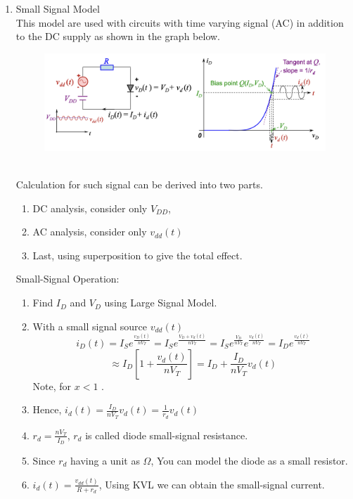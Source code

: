 \begin{enumerate}
\begin{enumerate}
    \end{enumerate}
    \newpage
    \item Small Signal Model \\
    This model are used with circuits with time varying signal (AC) in addition to the DC supply as shown in the graph below.
    \begin{figure}[h]
        \centering
        \includegraphics[width=1\linewidth]{image/smallsignalmodel.png}
    \end{figure}\\
    Calculation for such signal can be derived into two parts.
    \begin{enumerate}
        \item DC analysis, consider only $V_{DD}$, 
        \item AC analysis, consider only $v_{dd}(t)$
        \item Last, using superposition to give the total effect.
    \end{enumerate}
    Small-Signal Operation:
    \begin{enumerate}
        \item Find $I_D$ and $V_D$ using Large Signal Model.
        \item With a small signal source $v_{dd}(t)$
        \[i_D(t) = I_S e^{\frac{v_D(t)}{nV_T}} = I_S e^{\frac{V_D + v_d(t)}{nV_T}} = I_S e^{\frac{V_D}{nV_T}} e^{\frac{v_d(t)}{nV_T}} = I_D e^{\frac{v_d(t)}{nV_T}}\]
        \[\approx I_D[1+\frac{v_d(t)}{nV_T}] = I_D + \frac{I_D}{nV_T}v_d(t)\]
        Note, {\color{red}{\(e^x \approx 1 + x\)}} for $x < 1$ .
        \item Hence, $\displaystyle i_d(t) = \frac{I_D}{nV_T}v_d(t) = \frac{1}{r_d}v_d(t)$
        \item \(r_d = \frac{nV_T}{I_D}\), $r_d$ is called diode small-signal resistance.
        \item Since $r_d$ having a unit as $\Omega$, You can model the diode as a small resistor.
        \item \(i_d(t) = \frac{v_{dd}(t)}{R+r_d}\), Using KVL we can obtain the small-signal current.

\end{enumerate}
\end{enumerate}
